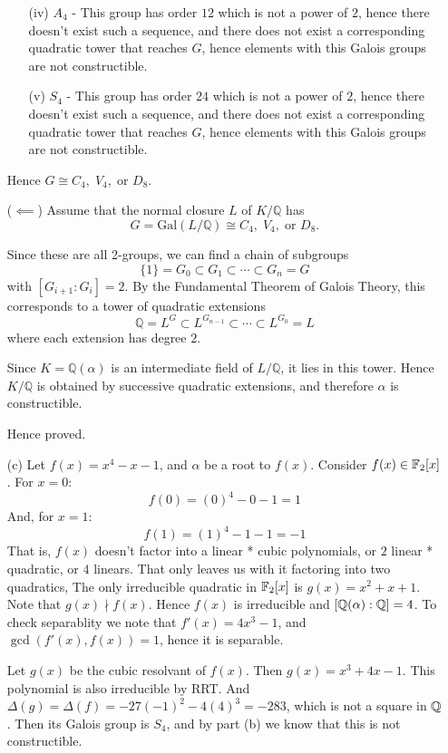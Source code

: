 \documentclass[12pt]{article}
\begin{document}
\begin{solution}
\begin{enumerate}
\begin{enumerate}
            \item [(iv)] $A_4$ - This group has order $12$ which is not a power of $2$, hence there doesn't exist such a sequence, and there does not exist a corresponding quadratic tower that reaches $G$, hence elements with this Galois groups are not constructible. 
            \item [(v)] $S_4$ - This group has order $24$ which is not a power of $2$, hence there doesn't exist such a sequence, and there does not exist a corresponding quadratic tower that reaches $G$, hence elements with this Galois groups are not constructible.  
        \end{enumerate}


        Hence $G \cong C_4, \; V_4, \; \text{or } D_8$. 
        \bbni 

        ($\impliedby$) Assume that the normal closure $L$ of $K/\mathbb{Q}$ has
        \[
        G = \mathrm{Gal}(L/\mathbb{Q}) \cong C_4, \; V_4, \; \text{or } D_8.
        \]

        Since these are all 2-groups, we can find a chain of subgroups
        \[
        \{1\} = G_0 \subset G_1 \subset \cdots \subset G_n = G
        \]
        with $[G_{i+1} : G_i] = 2$. By the Fundamental Theorem of Galois Theory, this corresponds to a tower of quadratic extensions
        \[
        \mathbb{Q} = L^G \subset L^{G_{n-1}} \subset \cdots \subset L^{G_0} = L
        \]
        where each extension has degree $2$.

        Since $K = \mathbb{Q}(\alpha)$ is an intermediate field of $L/\mathbb{Q}$, it lies in this tower. Hence $K/\mathbb{Q}$ is obtained by successive quadratic extensions, and therefore $\alpha$ is constructible.

        Hence proved. 

        \item [(c)] Let $f(x) = x^4  -x -1$, and $\alpha$ be a root to $f(x)$. Consider $f(x) \in \mathbb F_2[x]$. For $x = 0$: 
        \[f(0) = (0)^4 - 0 - 1 = 1\]
        And, for $x = 1$: 
        \[f(1) = (1)^4 - 1 - 1 = -1\]
        That is, $f(x)$ doesn't factor into a linear * cubic polynomials, or  $2$ linear * quadratic, or $4$ linears. That only leaves us with it factoring into two quadratics, The only irreducible quadratic in $\mathbb F_2[x]$ is $g(x) = x^2 + x + 1$. Note that $g(x) \nmid f(x)$. 
        Hence $f(x)$ is irreducible and $[\mathbb Q(\alpha):\mathbb Q] = 4$. To check separablity we note that $f'(x) = 4x^3 - 1$, and $\gcd(f'(x), f(x)) =1$, hence it is separable. 
        
        Let $g(x)$ be the cubic resolvant of $f(x)$. Then $g(x) = x^3 +4x - 1$. This polynomial is also irreducible by RRT. And $\Delta(g) = \Delta(f) = -27(-1)^2 - 4(4)^3 = -283$, which is not a square in $\mathbb Q$. Then its Galois group is $S_4$, and by part (b) we know that this is not constructible. 
    \end{enumerate}
\end{solution}
\end{document}
